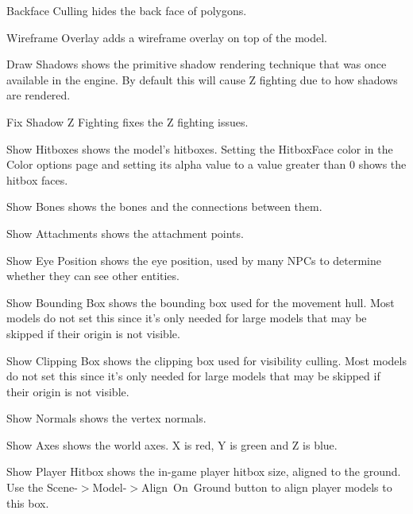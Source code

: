\documentclass[10pt, a4paper, titlepage, oneside]{article}
\begin{document}
\vspace{\baselineskip}
Backface Culling hides the back face of polygons.

\vspace{\baselineskip}
Wireframe Overlay adds a wireframe overlay on top of the model.

\vspace{\baselineskip}
Draw Shadows shows the primitive shadow rendering technique that was once available in the engine. By default this will cause Z fighting due to how shadows are rendered.

\vspace{\baselineskip}
Fix Shadow Z Fighting fixes the Z fighting issues.

\vspace{\baselineskip}
Show Hitboxes shows the model's hitboxes. Setting the HitboxFace color in the Color options page and setting its alpha value to a value greater than 0 shows the hitbox faces.

\vspace{\baselineskip}
Show Bones shows the bones and the connections between them.

\vspace{\baselineskip}
Show Attachments shows the attachment points.

\vspace{\baselineskip}
Show Eye Position shows the eye position, used by many NPCs to determine whether they can see other entities.

\vspace{\baselineskip}
Show Bounding Box shows the bounding box used for the movement hull. Most models do not set this since it's only needed for large models that may be skipped if their origin is not visible.

\vspace{\baselineskip}
Show Clipping Box shows the clipping box used for visibility culling. Most models do not set this since it's only needed for large models that may be skipped if their origin is not visible.

\vspace{\baselineskip}
Show Normals shows the vertex normals.

\vspace{\baselineskip}
Show Axes shows the world axes. X is red, Y is green and Z is blue.

\vspace{\baselineskip}
Show Player Hitbox shows the in-game player hitbox size, aligned to the ground. Use the \mbox{Scene-$>$Model-$>$Align On Ground} button to align player models to this box.
\end{document}
